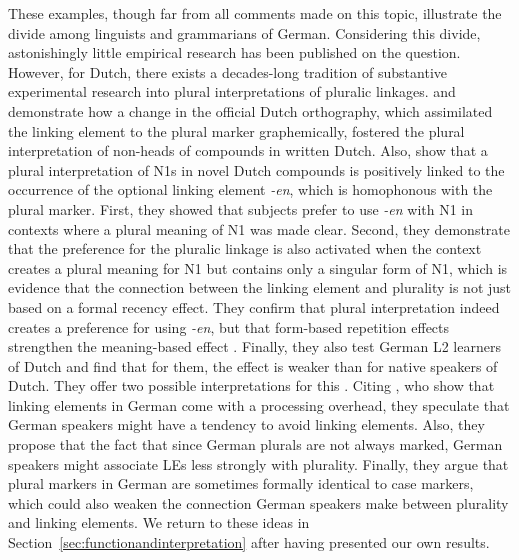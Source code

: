 These examples, though far from all comments made on this topic, illustrate the divide among linguists and grammarians of German.
Considering this divide, astonishingly little empirical research has been published on the question.
However, for Dutch, there exists a decades-long tradition of substantive experimental research into plural interpretations of pluralic linkages.
\textcite{SchreuderEa1998} and \textcite{BangaEa2012} demonstrate how a change in the official Dutch orthography, which assimilated the linking element to the plural marker graphemically, fostered the plural interpretation of non-heads of compounds in written Dutch.
Also, \textcite{BangaEa2013a} show that a plural interpretation of N1s in novel Dutch compounds is positively linked to the occurrence of the optional linking element \textit{-en}, which is homophonous with the plural marker.
First, they showed that subjects prefer to use \textit{-en} with N1 in contexts where a plural meaning of N1 was made clear.
Second, they demonstrate that the preference for the pluralic linkage is also activated when the context creates a plural meaning for N1 but contains only a singular form of N1, which is evidence that the connection between the linking element and plurality is not just based on a formal recency effect.
They confirm that plural interpretation indeed creates a preference for using \textit{-en}, but that form-based repetition effects strengthen the meaning-based effect \parencite[45]{BangaEa2013a}.
Finally, they also test German L2 learners of Dutch and find that for them, the effect is weaker than for native speakers of Dutch.
They offer two possible interpretations for this \parencite[45--47]{BangaEa2013a}.
Citing \textcite{LibbenEa2002}, who show that linking elements in German come with a processing overhead, they speculate that German speakers might have a tendency to avoid linking elements.
Also, they propose that the fact that since German plurals are not always marked, German speakers might associate LEs less strongly with plurality.
Finally, they argue that plural markers in German are sometimes formally identical to case markers, which could also weaken the connection German speakers make between plurality and linking elements.
We return to these ideas in Section~\ref{sec:functionandinterpretation} after having presented our own results.

